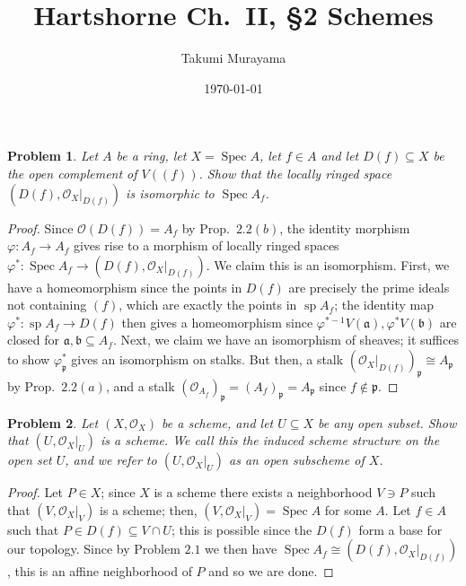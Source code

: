 \documentclass[12pt,letterpaper]{article}
\title{Hartshorne Ch.~II, \S2 Schemes}
\author{Takumi Murayama}
\date{\today}
\newtheorem{problem}{Problem}[section]
\theoremstyle{definition}
\theoremstyle{remark}
\numberwithin{equation}{section}
\numberwithin{figure}{problem}
\DeclareMathOperator{\Spec}{Spec}
\DeclareMathOperator{\Sp}{sp}
\newcommand{\OO}{\mathcal{O}}
\begin{document}
\maketitle
\setcounter{section}{2}
\begin{problem}
  Let $A$ be a ring, let $X = \Spec A$, let $f \in A$ and let $D(f) \subseteq X$ be the open complement of $V((f))$. Show that the locally ringed space $(D(f),\OO_X\vert_{D(f)})$ is isomorphic to $\Spec A_f$.
\end{problem}
\begin{proof}
  Since $\OO(D(f)) = A_f$ by Prop.~$2.2(b)$, the identity morphism $\varphi\colon A_f \to A_f$ gives rise to a morphism of locally ringed spaces $\varphi^*\colon\Spec A_f \to (D(f),\OO_X\vert_{D(f)})$. We claim this is an isomorphism. First, we have a homeomorphism since the points in $D(f)$ are precisely the prime ideals not containing $(f)$, which are exactly the points in $\Sp A_f$; the identity map $\varphi^*\colon\Sp A_f \to D(f)$ then gives a homeomorphism since $\varphi^{*-1}V(\mathfrak{a}),\varphi^*V(\mathfrak{b})$ are closed for $\mathfrak{a},\mathfrak{b} \subseteq A_f$. Next, we claim we have an isomorphism of sheaves; it suffices to show $\varphi^*_\mathfrak{p}$ gives an isomorphism on stalks. But then, a stalk $(\OO_X\vert_{D(f)})_\mathfrak{p} \cong A_{\mathfrak{p}}$ by Prop.~$2.2(a)$, and a stalk $(\OO_{A_f})_\mathfrak{p} = (A_f)_\mathfrak{p} = A_\mathfrak{p}$ since $f \notin \mathfrak{p}$.
\end{proof}

\begin{problem}
  Let $(X,\OO_X)$ be a scheme, and let $U \subseteq X$ be any open subset. Show that $(U,\OO_X\vert_U)$ is a scheme. We call this the \emph{induced scheme structure} on the open set $U$, and we refer to $(U,\OO_X\vert_U)$ as an \emph{open subscheme of $X$}.
\end{problem}
\begin{proof}
  Let $P \in X$; since $X$ is a scheme there exists a neighborhood $V \ni P$ such that $(V,\OO_X\vert_V)$ is a scheme; then, $(V,\OO_X\vert_V) = \Spec A$ for some $A$. Let $f \in A$ such that $P \in D(f) \subseteq V \cap U$; this is possible since the $D(f)$ form a base for our topology. Since by Problem $2.1$ we then have $\Spec A_f \cong (D(f),\OO_X\vert_{D(f)})$, this is an affine neighborhood of $P$ and so we are done.
\end{proof}
\end{document}
